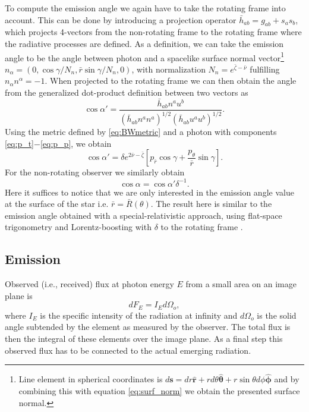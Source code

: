 \documentclass{aa}
\newcommand{\be}{\begin{equation}}
\newcommand{\ee}{\end{equation}}
\renewcommand{\vec}[1]{\ensuremath{\boldsymbol{#1}}}
\newcommand{\rb}{\ensuremath{\bar{r}}}
\newcommand{\nub}{\ensuremath{\bar{\nu}}}
\newcommand{\zetab}{\ensuremath{\bar{\zeta}}}
\begin{document}
To compute the emission angle we again have to take the rotating frame into account.  
This can be done by introducing a projection operator $\bar{h}_{ab} = g_{ab} + s_a s_b$, which projects 4-vectors from the non-rotating frame to the rotating frame where the radiative processes are defined.  
As a definition, we can take the emission angle to be the angle between photon and a spacelike surface normal vector\footnote{
Line element in spherical coordinates is $d\vec{s} = dr \vec{\hat{r}} + r d\theta \vec{\hat{\theta}} + r \sin\theta d\phi \vec{\hat{\phi}}$ and by combining this with equation \eqref{eq:surf_norm} we obtain the presented surface normal.
}
$n_{\alpha} = (0, \cos\gamma/N_n, \rb \sin\gamma/N_n, 0)$, with normalization $N_n = e^{\zetab - \nub}$ fulfilling $n_{\alpha}n^{\alpha} = -1$.  
When projected to the rotating frame we can then obtain the angle from the generalized dot-product definition between two vectors as
\be\label{eq:gen_angle}
\cos\alpha' = \frac{\bar{h}_{ab}n^a u^b}{(\bar{h}_{ab} n^a n^a)^{1/2} (\bar{h}_{ab} u^a u^b)^{1/2}}.
\ee
Using the metric defined by \eqref{eq:BWmetric} and a photon with components \eqref{eq:p_t}$-$\eqref{eq:p_p}, we obtain
\be\label{eq:cosap}
\cos\alpha' = \delta e^{2\nub-\zetab} \left[ p_{\rb} \cos\gamma + \frac{p_{\theta}}{\rb}\sin\gamma \right].
\ee
For the non-rotating observer we similarly obtain 
\be\label{eq:cosa}
\cos\alpha = \cos\alpha' \delta^{-1}.
\ee
Here it suffices to notice that we are only interested in the emission angle value at the surface of the star i.e. $\rb = \bar{R}(\theta)$.
The result here is similar to the emission angle obtained with a special-relativistic approach, using flat-space trigonometry and Lorentz-boosting with $\delta$ to the rotating frame \citep[see e.g.,][]{PB06}.


\subsection{Emission}\label{sect:emission}
Observed (i.e., received) flux at photon energy $E$ from a small area on an image plane is
\be
dF_E = I_E d\Omega_o,
\ee
where $I_E$ is the specific intensity of the radiation at infinity and $d\Omega_o$ is the solid angle subtended by the element as measured by the observer. 
The total flux is then the integral of these elements over the image plane.
As a final step this observed flux has to be connected to the actual emerging radiation.
\end{document}
